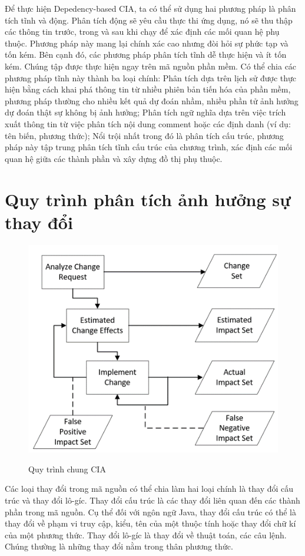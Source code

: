\documentclass[12pt]{report}
\begin{document}
Để thực hiện Depedency-based CIA, ta có thể sử dụng hai phương pháp là phân tích tĩnh và động. Phân tích động sẽ yêu cầu thực thi ứng dụng, nó sẽ thu thập các thông tin trước, trong và sau khi chạy để xác định các mối quan hệ phụ thuộc. Phương pháp này mang lại chính xác cao nhưng đòi hỏi sự phức tạp và tốn kém. Bên cạnh đó, các phương pháp phân tích tĩnh dễ thực hiện và ít tốn kém. Chúng tập được thực hiện ngay trên mã nguồn phần mềm. Có thể chia các phương pháp tĩnh này thành ba loại chính: Phân tích dựa trên lịch sử được thực hiện bằng cách khai phá thông tin từ nhiều phiên bản tiến hóa của phần mềm, phương pháp thường cho nhiều kết quả dự đoán nhầm, nhiều phần tử ảnh hưởng dự đoán thật sự không bị ảnh hưởng; Phân tích ngữ nghĩa dựa trên việc trích xuất thông tin từ việc phân tích nội dung comment hoặc các định danh (ví dụ: tên biến, phương thức); Nổi trội nhất trong đó là phân tích cấu trúc, phương pháp này tập trung phân tích tĩnh cấu trúc của chương trình, xác định các mối quan hệ giữa các thành phần và xây dựng đồ thị phụ thuộc.

\section{Quy trình phân tích ảnh hưởng sự thay đổi}
\begin{figure}[h]
	\centering
	\includegraphics[scale=0.8]{CIA-process}
	\label{fig:cia-process}
	\caption{Quy trình chung CIA}
\end{figure}

Các loại thay đổi trong mã nguồn có thể chia làm hai loại chính là thay đổi cấu trúc và thay đổi lô-gíc. Thay đổi cấu trúc là các thay đổi liên quan đến các thành phần trong mã nguồn. Cụ thể đối với ngôn ngữ Java, thay đổi cấu trúc có thể là thay đổi về phạm vi truy cập, kiểu, tên của một thuộc tính hoặc thay đổi chữ kí của một phương thức. Thay đổi lô-gíc là thay đổi về thuật toán, các câu lệnh. Chúng thường là những thay đổi nằm trong thân phương thức.
\end{document}
